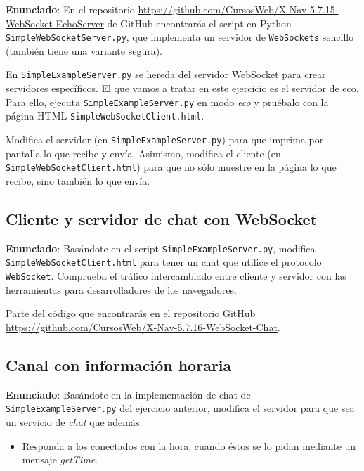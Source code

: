 \textbf{Enunciado}: En el repositorio \url{https://github.com/CursosWeb/X-Nav-5.7.15-WebSocket-EchoServer} de GitHub encontrarás el script en Python \texttt{SimpleWebSocketServer.py}, que implementa un servidor de \texttt{WebSockets} sencillo (también tiene una variante segura). 

En \texttt{SimpleExampleServer.py} se hereda del servidor WebSocket para crear servidores específicos. El que vamos a tratar en este ejercicio es el servidor de eco. Para ello, ejecuta \texttt{SimpleExampleServer.py} en modo \emph{eco} y pruébalo con la página HTML \texttt{SimpleWebSocketClient.html}.

Modifica el servidor (en \texttt{SimpleExampleServer.py}) para que imprima por pantalla lo que recibe y envía. Asimismo, modifica el cliente (en \texttt{SimpleWebSocketClient.html}) para que no sólo muestre en la página lo que recibe, sino también lo que envía.


\subsection{Cliente y servidor de chat con WebSocket}
\label{subsec:websocket-cliente-servidor-chat}

\textbf{Enunciado}: Basándote en el script \texttt{SimpleExampleServer.py}, modifica \texttt{SimpleWebSocketClient.html} para tener un chat que utilice el protocolo \texttt{WebSocket}. Comprueba el tráfico intercambiado entre cliente y servidor con las herramientas para desarrolladores de los navegadores. 

Parte del código que encontrarás en el repositorio GitHub  \url{https://github.com/CursosWeb/X-Nav-5.7.16-WebSocket-Chat}.


\subsection{Canal con información horaria}
\label{subsec:websocket-canal-obsesion-horaria}

\textbf{Enunciado}: Basándote en la implementación de chat de \texttt{SimpleExampleServer.py} del ejercicio anterior, modifica el servidor para que sea un servicio de \emph{chat} que además:
\begin{itemize}
  \item Responda a los conectados con la hora, cuando éstos se lo pidan mediante un mensaje \emph{getTime}.
\end{itemize}


